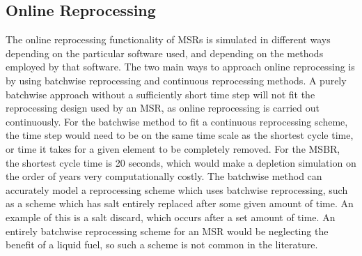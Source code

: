 \subsection{Online Reprocessing}

The online reprocessing functionality of MSRs is simulated in different ways depending on the particular software used, and depending on the methods employed by that software. The two main ways to approach online reprocessing is by using batchwise reprocessing and continuous reprocessing methods. %
A purely batchwise approach without a sufficiently short time step will not fit the reprocessing design used by an MSR, as online reprocessing is carried out continuously.
For the batchwise method to fit a continuous reprocessing scheme, the time step would need to be on the same time scale as the shortest cycle time, or time it takes for a given element to be completely removed.
For the MSBR, the shortest cycle time is 20 seconds, which would make a depletion simulation on the order of years very computationally costly.
The batchwise method can accurately model a reprocessing scheme which uses batchwise reprocessing, such as a scheme which has salt entirely replaced after some given amount of time. An example of this is a salt discard, which occurs after a set amount of time. An entirely batchwise reprocessing scheme for an MSR would be neglecting the benefit of a liquid fuel, so such a scheme is not common in the literature.

